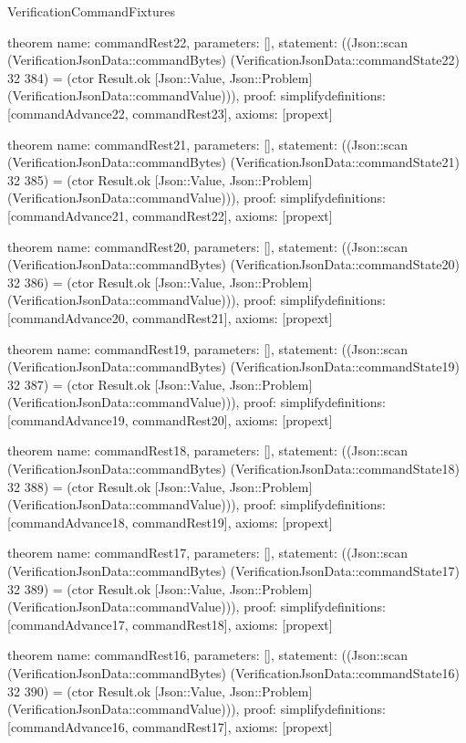 \begin{lexlean}{VerificationCommandFixtures}
\begin{semanticmodule}
theorem{
  name: commandRest22,
  parameters: [],
  statement: ((Json::scan (VerificationJsonData::commandBytes) (VerificationJsonData::commandState22) 32 384) = (ctor Result.ok [Json::Value, Json::Problem] (VerificationJsonData::commandValue))),
  proof: simplify{definitions: [commandAdvance22, commandRest23]},
  axioms: [propext]
}

theorem{
  name: commandRest21,
  parameters: [],
  statement: ((Json::scan (VerificationJsonData::commandBytes) (VerificationJsonData::commandState21) 32 385) = (ctor Result.ok [Json::Value, Json::Problem] (VerificationJsonData::commandValue))),
  proof: simplify{definitions: [commandAdvance21, commandRest22]},
  axioms: [propext]
}

theorem{
  name: commandRest20,
  parameters: [],
  statement: ((Json::scan (VerificationJsonData::commandBytes) (VerificationJsonData::commandState20) 32 386) = (ctor Result.ok [Json::Value, Json::Problem] (VerificationJsonData::commandValue))),
  proof: simplify{definitions: [commandAdvance20, commandRest21]},
  axioms: [propext]
}

theorem{
  name: commandRest19,
  parameters: [],
  statement: ((Json::scan (VerificationJsonData::commandBytes) (VerificationJsonData::commandState19) 32 387) = (ctor Result.ok [Json::Value, Json::Problem] (VerificationJsonData::commandValue))),
  proof: simplify{definitions: [commandAdvance19, commandRest20]},
  axioms: [propext]
}

theorem{
  name: commandRest18,
  parameters: [],
  statement: ((Json::scan (VerificationJsonData::commandBytes) (VerificationJsonData::commandState18) 32 388) = (ctor Result.ok [Json::Value, Json::Problem] (VerificationJsonData::commandValue))),
  proof: simplify{definitions: [commandAdvance18, commandRest19]},
  axioms: [propext]
}

theorem{
  name: commandRest17,
  parameters: [],
  statement: ((Json::scan (VerificationJsonData::commandBytes) (VerificationJsonData::commandState17) 32 389) = (ctor Result.ok [Json::Value, Json::Problem] (VerificationJsonData::commandValue))),
  proof: simplify{definitions: [commandAdvance17, commandRest18]},
  axioms: [propext]
}

theorem{
  name: commandRest16,
  parameters: [],
  statement: ((Json::scan (VerificationJsonData::commandBytes) (VerificationJsonData::commandState16) 32 390) = (ctor Result.ok [Json::Value, Json::Problem] (VerificationJsonData::commandValue))),
  proof: simplify{definitions: [commandAdvance16, commandRest17]},
  axioms: [propext]
}


\end{semanticmodule}
\end{lexlean}
